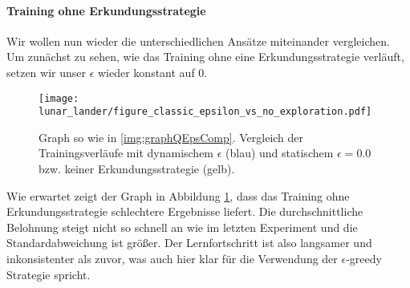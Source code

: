 \paragraph{Training ohne Erkundungsstrategie}
Wir wollen nun wieder die unterschiedlichen Ansätze miteinander vergleichen. Um zunächst zu sehen, wie das Training ohne eine Erkundungsstrategie verläuft, setzen wir unser $ \epsilon $ wieder konstant auf 0.

\begin{figure}[h!]
    \centering
    \texttt{[image: lunar\_lander/figure\_classic\_epsilon\_vs\_no\_exploration.pdf]}
    \caption{Graph so wie in \ref{img:graphQEpsComp}. Vergleich der Trainingsverläufe mit dynamischem $ \epsilon $ (blau) und statischem $ \epsilon = 0.0 $ bzw. keiner Erkundungsstrategie (gelb).} \label{img:lunarClassicEps01VsNoExploration}
\end{figure}

Wie erwartet zeigt der Graph in Abbildung \ref{img:lunarClassicEps01VsNoExploration}, dass das Training ohne Erkundungsstrategie schlechtere Ergebnisse liefert. Die durchschnittliche Belohnung steigt nicht so schnell an wie im letzten Experiment und die Standardabweichung ist größer. Der Lernfortschritt ist also langsamer und inkonsistenter als zuvor, was auch hier klar für die Verwendung der $ \epsilon $-greedy Strategie spricht.

